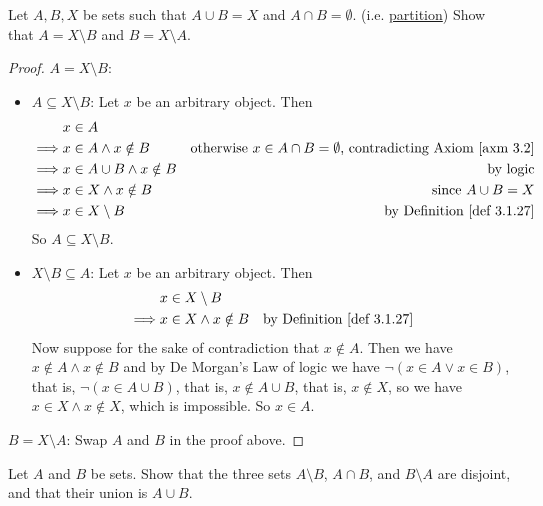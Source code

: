 \begin{exercise}\label{exercise 3.1.9}
Let \(A, B, X\) be sets such that \(A \cup B = X\) and \(A \cap B = \emptyset\). (i.e. \href{https://www.wikiwand.com/en/Partition_of_a_set}{partition}) Show that \(A = X \setminus B\) and \(B = X \setminus A\).
\end{exercise}

\begin{proof}
\(A = X \setminus B\):
\begin{itemize}
    \item \(A \subseteq X \setminus B\): Let \(x\) be an arbitrary object. Then
        \begin{align*}
                 & x \in A \\
        \implies & x \in A \land x \notin B & \text{otherwise \(x \in A \cap B = \emptyset\), contradicting \AXM{3.2}} \\
        \implies & x \in A \cup B \land x \notin B & \text{by logic} \\
        \implies & x \in X \land x \notin B & \text{since \(A \cup B = X\)} \\
        \implies & x \in X \setminus B & \text{by \DEF{3.1.27}}
        \end{align*}
        So \(A \subseteq X \setminus B\).
    \item \(X \setminus B \subseteq A\): Let \(x\) be an arbitrary object. Then
        \begin{align*}
                 & x \in X \setminus B \\
        \implies & x \in X \land x \notin B & \text{by \DEF{3.1.27}} \\
        \end{align*}
        Now suppose for the sake of contradiction that \(x \notin A\). Then we have \(x \notin A \land x \notin B\) and by De Morgan's Law of logic we have \(\lnot (x \in A \lor x \in B)\), that is, \(\lnot (x \in A \cup B)\), that is, \(x \notin A \cup B\), that is, \(x \notin X\), so we have \(x \in X \land x \notin X\), which is impossible. So \(x \in A\).
\end{itemize}

\(B = X \setminus A\): Swap \(A\) and \(B\) in the proof above.
\end{proof}

\begin{exercise}\label{exercise 3.1.10}
Let \(A\) and \(B\) be sets. Show that the three sets \(A \setminus B\), \(A \cap B\), and \(B \setminus A\) are disjoint, and that their union is \(A \cup B\).
\end{exercise}

